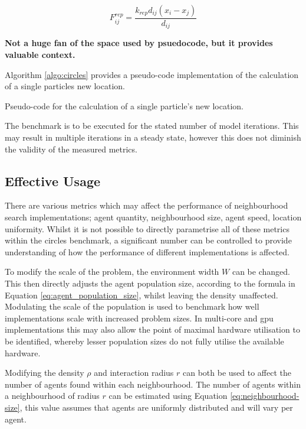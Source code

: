       \begin{equation}\label{eq:timestep-repulsion}
        F_{ij}^{rep} = \frac{k_{rep}d_{ij}(x_{i} - x_{j})} {d_{ij}}
      \end{equation}
      
      \textbf{Not a huge fan of the space used by psuedocode, but it provides valuable context.}
      
      Algorithm \ref{algo:circles} provides a pseudo-code implementation of the calculation of a single particles new location.
\begin{algorithm}

\caption{\label{algo:circles}Pseudo-code for the calculation of a single particle's new location.}
\end{algorithm}
      The benchmark is to be executed for the stated number of model iterations. This may result in multiple iterations in a steady state, however this does not diminish the validity of the measured metrics.
    
  \subsection{Effective Usage\label{sec:effective-usage}}
    There are various metrics which may affect the performance of neighbourhood search implementations; agent quantity, neighbourhood size, agent speed, location uniformity. Whilst it is not possible to directly parametrise all of these metrics within the circles benchmark, a significant number can be controlled to provide understanding of how the performance of different implementations is affected.
    
    To modify the scale of the problem, the environment width $W$ can be changed. This then directly adjusts the agent population size, according to the formula in Equation \ref{eq:agent_population_size}, whilst leaving the density unaffected. Modulating the scale of the population is used to benchmark how well implementations scale with increased problem sizes. In multi-core and \gls{gpu} implementations this may also allow the point of maximal hardware utilisation to be identified, whereby lesser population sizes do not fully utilise the available hardware.
    
    Modifying the density $\rho$ and interaction radius $r$ can both be used to affect the number of agents found within each neighbourhood. The number of agents within a neighbourhood of radius $r$ can be estimated using Equation \ref{eq:neighbourhood-size}, this value assumes that agents are uniformly distributed and will vary per agent.
    
